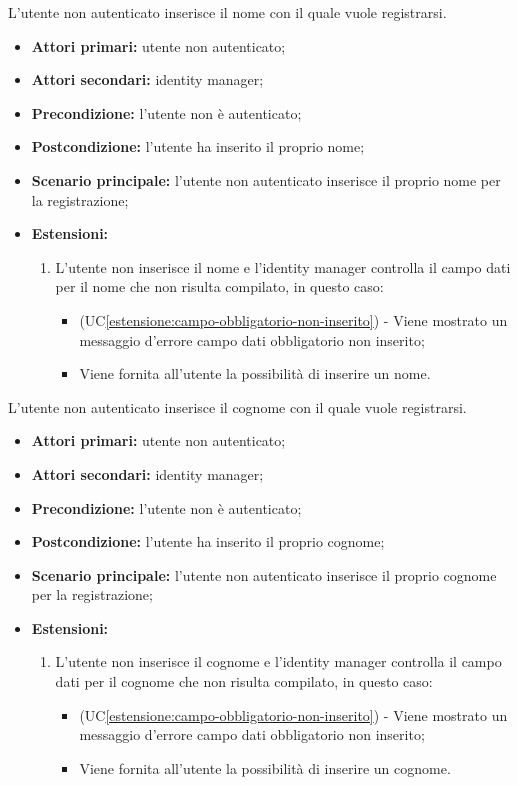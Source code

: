 L'utente non autenticato inserisce il nome con il quale vuole registrarsi.
\begin{itemize}
	\item \textbf{Attori primari:} utente non autenticato;
	\item \textbf{Attori secondari:} identity manager;
	\item \textbf{Precondizione:} l'utente non è autenticato;
	\item \textbf{Postcondizione:} l'utente ha inserito il proprio nome;
	\item \textbf{Scenario principale:} l'utente non autenticato inserisce il proprio nome per la registrazione;
	\item \textbf{Estensioni:}
	\begin{enumerate}[label=\lett]
		\item L'utente non inserisce il nome e l'identity manager controlla il campo dati per il nome che non risulta compilato, in questo caso:
		\begin{itemize}
			\item (UC\ref{estensione:campo-obbligatorio-non-inserito}) - Viene mostrato un messaggio d'errore campo dati obbligatorio non inserito;
			\item Viene fornita all'utente la possibilità di inserire un nome.
		\end{itemize}
	\end{enumerate} 
\end{itemize}

\label{registrazione.modulo.cognome}

L'utente non autenticato inserisce il cognome con il quale vuole registrarsi.
\begin{itemize}
	\item \textbf{Attori primari:} utente non autenticato;
	\item \textbf{Attori secondari:} identity manager;
	\item \textbf{Precondizione:} l'utente non è autenticato;
	\item \textbf{Postcondizione:} l'utente ha inserito il proprio cognome;
	\item \textbf{Scenario principale:} l'utente non autenticato inserisce il proprio cognome per la registrazione;
	\item \textbf{Estensioni:}
	\begin{enumerate}[label=\lett]
		\item L'utente non inserisce il cognome e l'identity manager controlla il campo dati per il cognome che non risulta compilato, in questo caso:
		\begin{itemize}
			\item (UC\ref{estensione:campo-obbligatorio-non-inserito}) - Viene mostrato un messaggio d'errore campo dati obbligatorio non inserito;
			\item Viene fornita all'utente la possibilità di inserire un cognome.
		\end{itemize}
	\end{enumerate}
\end{itemize}


